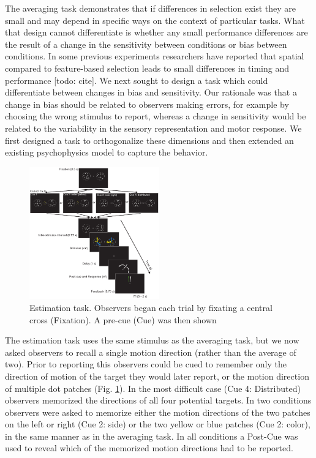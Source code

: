 The averaging task demonstrates that if differences in selection exist they are small and may depend in specific ways on the context of particular tasks. What that design cannot differentiate is whether any small performance differences are the result of a change in the sensitivity between conditions or bias between conditions. In some previous experiments researchers have reported that spatial compared to feature-based selection leads to small differences in timing \citep{Liu2007-ed} and performance [todo: cite]. We next sought to design a task which could differentiate between changes in bias and sensitivity. Our rationale was that a change in bias should be related to observers making errors, for example by choosing the wrong stimulus to report, whereas a change in sensitivity would be related to the variability in the sensory representation and motor response. We first designed a task to orthogonalize these dimensions and then extended an existing psychophysics model to capture the behavior. 

\begin{figure}
\centering
\includegraphics[keepaspectratio,width=0.5\textwidth]{figs_c4/f4_estimationtask.pdf}
\caption[Estimation task]{Estimation task. Observers began each trial by fixating a central cross (Fixation). A pre-cue (Cue) was then shown }
\label{fig:c4f4}
\end{figure}

The estimation task uses the same stimulus as the averaging task, but we now asked observers to recall a single motion direction (rather than the average of two). Prior to reporting this observers could be cued to remember only the direction of motion of the target they would later report, or the motion direction of multiple dot patches (Fig. \ref{fig:c4f4}). In the most difficult case (Cue 4: Distributed) observers memorized the directions of all four potential targets. In two conditions observers were asked to memorize either the motion directions of the two patches on the left or right (Cue 2: side) or the two yellow or blue patches (Cue 2: color), in the same manner as in the averaging task. In all conditions a Post-Cue was used to reveal which of the memorized motion directions had to be reported.

